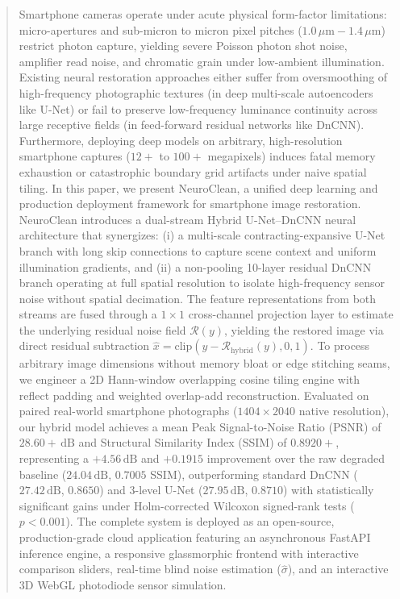 \documentclass{ieeeaccess}
\begin{document}
\begin{abstract}
Smartphone cameras operate under acute physical form-factor limitations: micro-apertures and sub-micron to micron pixel pitches ($1.0\,\mu\text{m} - 1.4\,\mu\text{m}$) restrict photon capture, yielding severe Poisson photon shot noise, amplifier read noise, and chromatic grain under low-ambient illumination. Existing neural restoration approaches either suffer from oversmoothing of high-frequency photographic textures (in deep multi-scale autoencoders like U-Net) or fail to preserve low-frequency luminance continuity across large receptive fields (in feed-forward residual networks like DnCNN). Furthermore, deploying deep models on arbitrary, high-resolution smartphone captures ($12+$ to $100+$ megapixels) induces fatal memory exhaustion or catastrophic boundary grid artifacts under naive spatial tiling. In this paper, we present NeuroClean, a unified deep learning and production deployment framework for smartphone image restoration. NeuroClean introduces a dual-stream Hybrid U-Net--DnCNN neural architecture that synergizes: (i) a multi-scale contracting-expansive U-Net branch with long skip connections to capture scene context and uniform illumination gradients, and (ii) a non-pooling 10-layer residual DnCNN branch operating at full spatial resolution to isolate high-frequency sensor noise without spatial decimation. The feature representations from both streams are fused through a $1 \times 1$ cross-channel projection layer to estimate the underlying residual noise field $\mathcal{R}(y)$, yielding the restored image via direct residual subtraction $\hat{x} = \text{clip}(y - \mathcal{R}_{\text{hybrid}}(y), 0, 1)$. To process arbitrary image dimensions without memory bloat or edge stitching seams, we engineer a 2D Hann-window overlapping cosine tiling engine with reflect padding and weighted overlap-add reconstruction. Evaluated on paired real-world smartphone photographs ($1404 \times 2040$ native resolution), our hybrid model achieves a mean Peak Signal-to-Noise Ratio (PSNR) of $28.60+\,\text{dB}$ and Structural Similarity Index (SSIM) of $0.8920+$, representing a $+4.56\,\text{dB}$ and $+0.1915$ improvement over the raw degraded baseline ($24.04\,\text{dB}$, $0.7005$ SSIM), outperforming standard DnCNN ($27.42\,\text{dB}$, $0.8650$) and 3-level U-Net ($27.95\,\text{dB}$, $0.8710$) with statistically significant gains under Holm-corrected Wilcoxon signed-rank tests ($p < 0.001$). The complete system is deployed as an open-source, production-grade cloud application featuring an asynchronous FastAPI inference engine, a responsive glassmorphic frontend with interactive comparison sliders, real-time blind noise estimation ($\hat{\sigma}$), and an interactive 3D WebGL photodiode sensor simulation.
\end{abstract}
\end{document}
